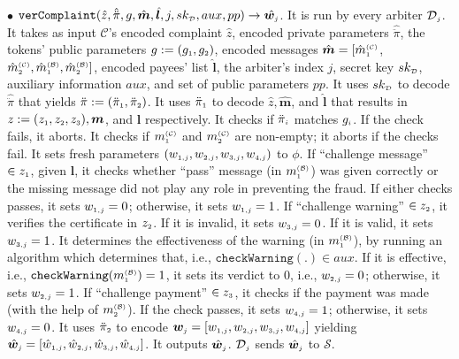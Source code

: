 \begin{definition}
%
\vspace{2mm}
\item  [$\bullet$] $\mathtt{verComplaint}( \hat z, \hat{\ddot{\pi}}, g, \hat{\bm m}, \hat{\bm{l}}, j, sk_{\scriptscriptstyle\mathcal D}, aux, pp)\rightarrow \hat{\bm{w}_{\scriptscriptstyle j}}$. It is run by every arbiter $\mathcal{D}_{\scriptscriptstyle  j}$. It takes as input  $\mathcal{C}$'s encoded complaint $\hat z$,  encoded private parameters $\hat{\ddot{\pi}}$,  the tokens' public parameters $g:=(g_{\scriptscriptstyle 1}, g_{\scriptscriptstyle 2})$,  encoded  messages $\hat{\bm m}=[\hat{m}_{\scriptscriptstyle 1}^{\scriptscriptstyle(\mathcal C)}$, $\hat{m}_{\scriptscriptstyle 2}^{\scriptscriptstyle(\mathcal C)}, \hat{m}_{\scriptscriptstyle 1}^{\scriptscriptstyle(\mathcal B)}, \hat{m}_{\scriptscriptstyle 2}^{\scriptscriptstyle(\mathcal B)}]$, encoded payees' list $ \hat{\bm{l}}$,  the  arbiter's index $j$, secret key $sk_{\scriptscriptstyle\mathcal D}$,   auxiliary information $aux$, and set of public parameters $pp$.  It uses $sk_{\scriptscriptstyle\mathcal D}$ to decode $\hat{\ddot{\pi}}$ that yields  $\ddot{\pi}:=(\ddot{\pi}_{\scriptscriptstyle 1}, \ddot{\pi}_{\scriptscriptstyle 2})$. It uses $\ddot{\pi}_{\scriptscriptstyle 1}$ to decode  $\hat z,  \hat{\bm{m}}$, and  $\hat{\bm{l}}$ that results in $z:=(z_{\scriptscriptstyle 1}, z_{\scriptscriptstyle 2}, z_{\scriptscriptstyle 3}), {\bm m}$, and  ${\bm{l}}$ respectively.  It checks if $\ddot{\pi}_{\scriptscriptstyle i}$ matches  $g_{\scriptscriptstyle i}$. If the check fails, it aborts.  It  checks  if ${m}_{\scriptscriptstyle 1}^{\scriptscriptstyle(\mathcal C)}$ and ${m}_{\scriptscriptstyle 2}^{\scriptscriptstyle(\mathcal C)}$ are non-empty; it aborts if the checks fail. It  sets  fresh parameters $(w_{\scriptscriptstyle 1,j}, w_{\scriptscriptstyle 2,j},  w_{\scriptscriptstyle 3,j},   w_{\scriptscriptstyle 4,j})$ to $\phi$. If ``challenge message'' $\in z_{\scriptscriptstyle 1}$, given $\bm l$,  it checks whether  ``pass''  message (in ${m}^{\scriptscriptstyle\mathcal{(B)}}_{\scriptscriptstyle1}$) was given correctly or the missing message did not play any role in preventing the fraud.  If either checks passes, it sets  $w_{\scriptscriptstyle 1,j}=0$;  otherwise,  it sets $w_{\scriptscriptstyle 1,j}=1$. If ``challenge warning'' $\in z_{\scriptscriptstyle 2}$,   it verifies  the certificate in $z_{\scriptscriptstyle 2}$.  If it is invalid,  it sets $ w_{\scriptscriptstyle 3,j}=0$.  If it is valid, it sets  $w_{\scriptscriptstyle 3,j}=1$. It  determines the effectiveness of the warning (in ${m}^{\scriptscriptstyle\mathcal{(B)}}_{\scriptscriptstyle1}$), by running an algorithm which  determines that, i.e., $\mathtt{checkWarning}(.)\in aux$. If  it is effective, i.e., $\mathtt{checkWarning}({m}^{\scriptscriptstyle\mathcal{(B)}}_{\scriptscriptstyle1})= 1$,  it sets its verdict to $0$, i.e., $w_{\scriptscriptstyle 2,j}=0$; otherwise, it sets $w_{\scriptscriptstyle 2,j}=1$.  If ``challenge payment'' $\in z_{\scriptscriptstyle 3}$,    it checks if the payment was made (with the help of ${m}_{\scriptscriptstyle 2}^{\scriptscriptstyle(\mathcal B)}$). If the check passes,  it sets $w_{\scriptscriptstyle 4,j}=1$; otherwise, it sets $w_{\scriptscriptstyle 4,j}=0$.  It uses $\ddot \pi_{\scriptscriptstyle 2}$ to encode  $\bm{w}_{\scriptscriptstyle j} = [w_{\scriptscriptstyle 1,j}, w_{\scriptscriptstyle 2, j}, w_{\scriptscriptstyle 3, j}, w_{\scriptscriptstyle 4, j}]$ yielding  $\hat{\bm{w}}_{\scriptscriptstyle j}= [\hat {w}_{\scriptscriptstyle 1,j}, \hat{w}_{\scriptscriptstyle 2, j}, \hat{w}_{\scriptscriptstyle 3, j}, \hat{w}_{\scriptscriptstyle 4, j}]$. It outputs $\hat{\bm{w}}_{\scriptscriptstyle j}$. $\mathcal{D}_{\scriptscriptstyle  j}$ sends $\hat{\bm{w}}_{\scriptscriptstyle j}$ to  $\mathcal{S}$. 

\end{definition}
